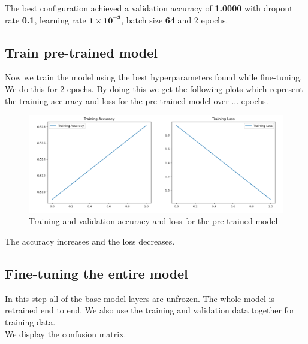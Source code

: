 \documentclass[conference]{IEEEtran}
\begin{document}
The best configuration achieved a validation accuracy of \textbf{1.0000} with dropout rate \textbf{0.1}, learning rate \(\mathbf{1\times10^{-3}}\), batch size \textbf{64} and 2 epochs.


\subsection{Train pre-trained model}
Now we train the model using the best hyperparameters found while fine-tuning. We do this for 2 epochs.
By doing this we get the following plots which represent the training accuracy and loss for the pre-trained model over ... epochs.

\begin{figure}[htbp]
	\centerline{\includegraphics[width=\linewidth]{Images/Transferlearning_2.png}}
	\caption{Training and validation accuracy and loss for the pre-trained model}
	\label{fig:baseline_curves}
\end{figure}

The accuracy increases and the loss decreases.

\subsection{Fine-tuning the entire model}
In this step all of the base model layers are unfrozen. The whole model is retrained end to end. We also use the training and validation data together for training data.\\

We display the confusion matrix.
\end{document}
